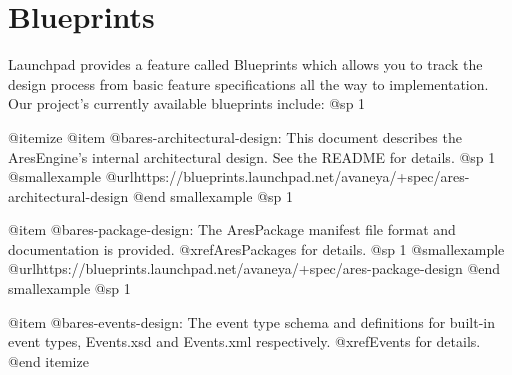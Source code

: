 \section{Blueprints}
Launchpad provides a feature called Blueprints which allows you to track the design process from basic feature specifications all the way to implementation. Our project's currently available blueprints include:
@sp 1

@itemize
@item
@b{ares-architectural-design}: This document describes the AresEngine's internal architectural design. See the README for details.
@sp 1
@smallexample
@url{https://blueprints.launchpad.net/avaneya/+spec/ares-architectural-design}
@end smallexample
@sp 1

@item
@b{ares-package-design}: The AresPackage manifest file format and documentation is provided. @xref{AresPackages} for details.
@sp 1
@smallexample
@url{https://blueprints.launchpad.net/avaneya/+spec/ares-package-design}
@end smallexample
@sp 1

@item
@b{ares-events-design}: The event type schema and definitions for built-in event types, Events.xsd and Events.xml respectively. @xref{Events} for details.
@end itemize

